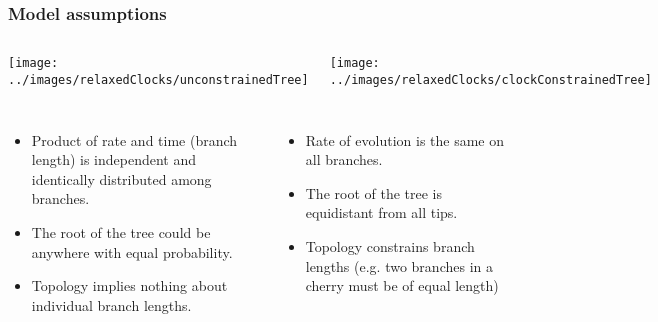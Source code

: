 
\begin{frame}
\frametitle{Model assumptions}

\begin{columns}


\begin{centering}

\texttt{[image: ../images/relaxedClocks/unconstrainedTree]}

\end{centering}


\begin{centering}

\texttt{[image: ../images/relaxedClocks/clockConstrainedTree]}

\end{centering}

\end{columns}

\begin{columns}[t]


\small{
\begin{itemize}
\item Product of rate and time (branch length) is independent and identically distributed among branches.
\item The root of the tree could be anywhere with equal probability.
\item Topology implies nothing about individual branch lengths.
\end{itemize}
}


\small{
\begin{itemize}
\item Rate of evolution is the same on all branches.
\item The root of the tree is equidistant from all tips.
\item Topology constrains branch lengths (e.g. two branches in a cherry must be of equal length)
\end{itemize}
}
\end{columns}

\end{frame}